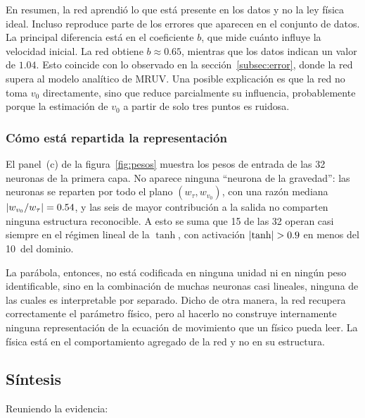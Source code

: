 \documentclass[titlepage,11pt]{article}
\providecommand{\num}[1]{\ensuremath{#1}}
\providecommand{\SI}[2]{#1\,#2}
\providecommand{\percent}{\char37\relax}
\begin{document}
En resumen, la red aprendió lo que está presente en los datos y no la ley física ideal. Incluso reproduce parte de los errores que aparecen en el conjunto de datos. La principal diferencia está en el coeficiente $b$, que mide cuánto influye la velocidad inicial. La red obtiene $b\approx\num{0.65}$, mientras que los datos indican un valor de $\num{1.04}$. Esto coincide con lo observado en la sección~\ref{subsec:error}, donde la red supera al modelo analítico de MRUV. Una posible explicación es que la red no toma $v_0$ directamente, sino que reduce parcialmente su influencia, probablemente porque la estimación de $v_0$ a partir de solo tres puntos es ruidosa.

\subsubsection{Cómo está repartida la representación}
\label{subsubsec:representacion}

El panel~(c) de la figura~\ref{fig:pesos} muestra los pesos de entrada de las
32 neuronas de la primera capa. No aparece ninguna \enquote{neurona de la
gravedad}: las neuronas se reparten por todo el plano $(w_\tau, w_{v_0})$, con
una razón mediana $\abs{w_{v_0}/w_\tau}=\num{0.54}$, y las seis de mayor
contribución a la salida no comparten ninguna estructura reconocible. A esto se
suma que 15 de las 32 operan casi siempre en el régimen lineal de la $\tanh$,
con activación $\abs{\tanh}>0.9$ en menos del \SI{10}{\percent} del dominio.

La parábola, entonces, no está codificada en ninguna unidad ni en ningún peso
identificable, sino en la combinación de muchas neuronas casi lineales,
ninguna de las cuales es interpretable por separado. Dicho de otra manera, la
red recupera correctamente el parámetro físico, pero al hacerlo no construye
internamente ninguna representación de la ecuación de movimiento que un físico
pueda leer. La física está en el
comportamiento agregado de la red y no en su estructura.

\subsection{Síntesis}

Reuniendo la evidencia:
\end{document}
